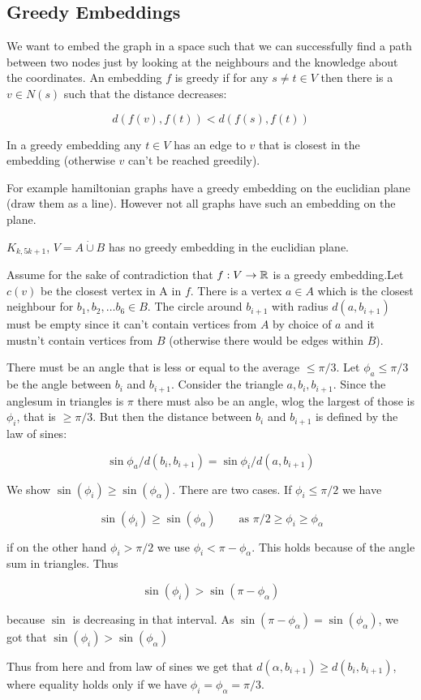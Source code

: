

\subsection{Greedy Embeddings}

We want to embed the graph in a space such that we can successfully find a path between two nodes just by looking at the neighbours and the knowledge about the coordinates. An embedding $f$ is greedy if for any $s\neq t\in V$ then there is a $v\in N(s)$ such that the distance decreases:

\[d(f(v),f(t)) < d(f(s),f(t))\]

In a greedy embedding any $t\in V$ has an edge to $v$ that is closest in the embedding (otherwise $v$ can't be reached greedily).

For example hamiltonian graphs have a greedy embedding on the euclidian plane (draw them as a line). However not all graphs have such an embedding on the plane.

\begin{lem} $K_{k,5k+1}$, $V=A\dot \cup B$ has no greedy embedding in the euclidian plane. 
\end{lem}

\begin{pr} Assume for the sake of contradiction that $f:V\rightarrow \mathbb{R}$ is a greedy embedding.Let $c(v)$ be the closest vertex in A in $f$. There is a vertex $a\in A$ which is the closest neighbour for $b_1,b_2,\ldots b_6\in B$. The circle around $b_{i+1}$ with radius $d(a,b_{i+1})$ must be empty since it can't contain vertices from $A$ by choice of $a$ and it mustn't contain vertices from $B$ (otherwise there would be edges within $B$). 


There must be an angle that is less or equal to the average $\leq \pi/3$. Let $\phi_a\leq \pi/3$ be the angle between $b_i$ and $b_{i+1}$. Consider the triangle $a,b_i,b_{i+1}$. Since the anglesum in triangles is $\pi$ there must also be an angle, wlog the largest of those is $\phi_i$, that is $\geq \pi/3$. But then the distance between $b_i$ and $b_{i+1}$ is defined by the law of sines:

\[\sin \phi_a / d(b_i,b_{i+1}) = \sin \phi_i / d(a,b_{i+1})\]

We show $\sin(\phi_i) \geq \sin(\phi_\alpha)$. There are two cases. If $\phi_i \leq \pi/2$ we have

\[\sin(\phi_i) \geq \sin(\phi_\alpha) \qquad \text{as } \pi/2\geq \phi_i\geq \phi_\alpha\]

if on the other hand $\phi_i > \pi/2$ we use $\phi_i < \pi -\phi_\alpha$. This holds because of the angle sum in triangles. Thus

\[\sin(\phi_i) > \sin(\pi -\phi_\alpha)\]

because $\sin$ is decreasing in that interval. As $\sin(\pi - \phi_\alpha) = \sin(\phi_\alpha)$, we got that $\sin(\phi_i) > \sin(\phi_\alpha)$

Thus from here and from law of sines we get that $d(\alpha, b_{i+1}) \ge d(b_i, b_{i+1})$, where equality holds only if we have $\phi_i = \phi_\alpha = \pi/3$.
\end{pr}

